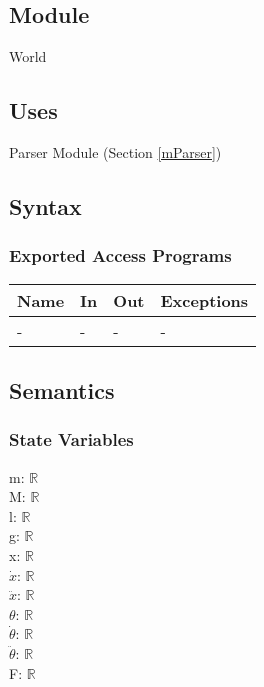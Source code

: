 \documentclass[12pt, titlepage]{article}
\begin{document}


\subsection{Module}

World

\subsection{Uses}

Parser Module (Section \ref{mParser})

\subsection{Syntax}


\subsubsection{Exported Access Programs}



\begin{center}
\begin{tabular}{p{2cm} p{4cm} p{4cm} p{2cm}}
\hline
\textbf{Name} & \textbf{In} & \textbf{Out} & \textbf{Exceptions} \\
\hline
- & - & - & - \\
\hline
\end{tabular}
\end{center}

\subsection{Semantics}

\subsubsection{State Variables}

m: $\mathbb{R}$ \\
M: $\mathbb{R}$ \\
l: $\mathbb{R}$ \\
g: $\mathbb{R}$ \\
x: $\mathbb{R}$ \\
$\dot{x}$: $\mathbb{R}$ \\
$\ddot{x}$: $\mathbb{R}$ \\
$\theta$: $\mathbb{R}$ \\
$\dot{\theta}$: $\mathbb{R}$ \\
$\ddot{\theta}$: $\mathbb{R}$ \\
F: $\mathbb{R}$ \\
\end{document}
